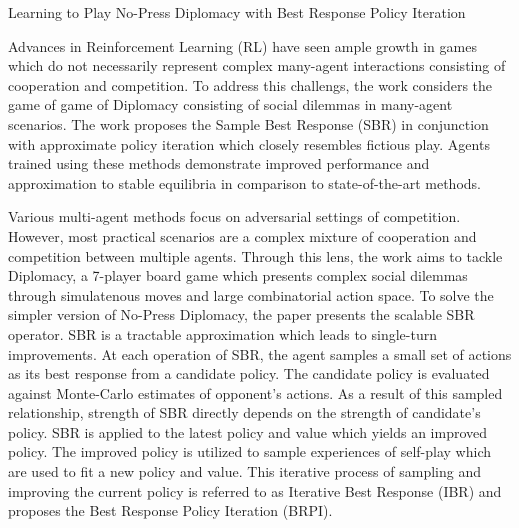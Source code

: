 \documentclass[11pt,letterpaper]{article}
\begin{document}
\begin{center}
  \large{Learning to Play No-Press Diplomacy
  with Best Response Policy Iteration}
\end{center}

Advances in Reinforcement Learning (RL) have seen ample growth in games which do not necessarily represent complex many-agent interactions consisting of cooperation and competition. To address this challengs, the work considers the game of game of Diplomacy consisting of social dilemmas in many-agent scenarios. The work proposes the Sample Best Response (SBR) in conjunction with approximate policy iteration which closely resembles fictious play. Agents trained using these methods demonstrate improved performance and approximation to stable equilibria in comparison to state-of-the-art methods. 

Various multi-agent methods focus on adversarial settings of competition. However, most practical scenarios are a complex mixture of cooperation and competition between multiple agents. Through this lens, the work aims to tackle Diplomacy, a 7-player board game which presents complex social dilemmas through simulatenous moves and large combinatorial action space. To solve the simpler version of No-Press Diplomacy, the paper presents the scalable SBR operator. SBR is a tractable approximation which leads to single-turn improvements. At each operation of SBR, the agent samples a small set of actions as its best response from a candidate policy. The candidate policy is evaluated against Monte-Carlo estimates of opponent's actions. As a result of this sampled relationship, strength of SBR directly depends on the strength of candidate's policy. SBR is applied to the latest policy and value which yields an improved policy. The improved policy is utilized to sample experiences of self-play which are used to fit a new policy and value. This iterative process of sampling and improving the current policy is referred to as Iterative Best Response (IBR) and proposes the Best Response Policy Iteration (BRPI). 
\end{document}
